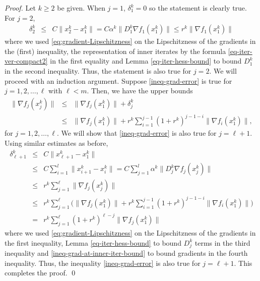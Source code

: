\documentclass[final,numbook]{svjour3}
\begin{document}
\begin{proof}
   Let $k\geq 2$ be given. When $j=1$, $\delta_1^k=0$ so the statement is clearly true. For $j=2$, 
\begin{eqnarray*}
	\delta_2^k &\leq & {C} \| x_2^k - x_1^k \| 
	=  {C} \alpha^k \big\| D_1^k \nabla f_1(x_1^k) \big\| 
	\leq  r^k  \big\| \nabla f_1(x_1^k)\big\|
\end{eqnarray*}  
where we used \eqref{eq:gradient-Lipschitzness} on the Lipschitzness of the gradients in the (first) inequality, the representation of inner iterates by the formula \eqref{eq-iter-ver-compact2} in the first equality and Lemma \ref{eq-iter-hess-bound} to bound $D_1^k$ in the second inequality. Thus, the statement is also true for $j=2$. We will proceed with an induction argument. Suppose \eqref{ineq-grad-error} is true for $j=1,2,\dots,\ell$ with $\ell<m$. Then, we have the upper bounds
\begin{eqnarray} \| \nabla f_j (x_j^k)\| &\leq & \| \nabla f_j(x_1^k)\| + \delta_j^k \nonumber \\ 
&\leq &
\| \nabla f_j(x_1^k)\| + r^k \sum_{i=1}^{j-1} (1+r^k)^{j-1-i} \| \nabla f_i(x_1^k)\|, 
\label{ineq-grad-at-inner-iter-bound}
\end{eqnarray}
for $j=1,2,\dots,\ell$. We will show that \eqref{ineq-grad-error} is also true for $j=\ell+1$. Using similar estimates as before,
\begin{eqnarray}\label{ineq-distance-bound-inner-iters-start}
  \delta_{\ell+1}^k &\leq & {C} \| x_{\ell+1}^k - x_1^k \| \\
  &\leq&  {C} \sum_{i=1}^l \| x_{i+1}^k - x_i^k \| 
   =  {C} \sum_{j=1}^l \alpha^k \| D_j^k \nabla f_j(x_j^k) \| \nonumber \\
   &\leq&  r^k \sum_{j=1}^\ell \| \nabla f_j(x_j^k) \| \nonumber \\
  & \leq & r^k \sum_{j=1}^\ell \bigg( \|\nabla f_j(x_1^k)\| + r^k \sum_{i=1}^{j-1} (1+r^k)^{j-1-i} \| \nabla f_i(x_1^k)\| \bigg) \nonumber \\
  & = & r^k \sum_{j=1}^\ell (1 + r^k)^{\ell - j} \| \nabla f_j (x_1^k) \| \label{ineq-distance-bound-inner-iters-end}
\end{eqnarray} 
where we used \eqref{eq:gradient-Lipschitzness} on the Lipschitzness of the gradients in the first inequality, Lemma \ref{eq-iter-hess-bound} to bound $D_j^k$ terms in the third inequality and \eqref{ineq-grad-at-inner-iter-bound} to bound gradients in the fourth inequality. Thus, the inequality \eqref{ineq-grad-error} is also true for $j=\ell+1$. This completes the proof. \qed
\end{proof}
\end{document}
